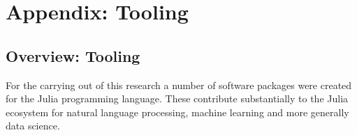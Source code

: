 \documentclass{book}
\begin{document}
	\part{Appendix: Tooling}
	
	\chapter{Overview: Tooling}
	For the carrying out of this research a number of software packages were created for the Julia programming language.
	These contribute substantially to the Julia ecosystem for natural language processing, machine learning and more generally data science.
	
	
%	
	
	
\end{document}
